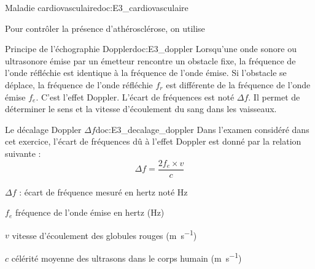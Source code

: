 \medskip

\begin{doc}{Maladie cardiovasculaire}{doc:E3_cardiovasculaire}

   Pour contrôler la présence d'athérosclérose, on utilise 
\end{doc}

\begin{doc}{Principe de l'échographie Doppler}{doc:E3_doppler}
  Lorsqu'une onde sonore ou ultrasonore émise par un émetteur rencontre un obstacle fixe, la fréquence de l’onde réfléchie est identique à la fréquence de l’onde émise.
  Si l'obstacle se déplace, la fréquence de l’onde réfléchie $f_r$ est différente de la fréquence de l’onde émise $f_e$.
  C’est l’effet Doppler.
  L’écart de fréquences est noté $\Delta f$.
  Il permet de déterminer le sens et la vitesse d'écoulement du sang dans les vaisseaux.
\end{doc}

\begin{doc}{Le décalage Doppler $\Delta f$}{doc:E3_decalage_doppler}
  Dans l’examen considéré dans cet exercice, l’écart de fréquences dû à l’effet Doppler est donné par la relation suivante :
  \begin{equation*}
    \Delta f = \dfrac{2f_e \times v}{c}
  \end{equation*}
  \begin{listePoints}
    \item $\Delta f$ : écart de fréquence mesuré en hertz noté \unit{\hertz}
    \item $f_e$ fréquence de l’onde émise en hertz (\unit{\hertz})
    \item $v$ vitesse d’écoulement des globules rouges (\unit{\m\per\s})
    \item $c$ célérité moyenne des ultrasons dans le corps humain (\unit{\m\per\s})
  \end{listePoints}
\end{doc}


